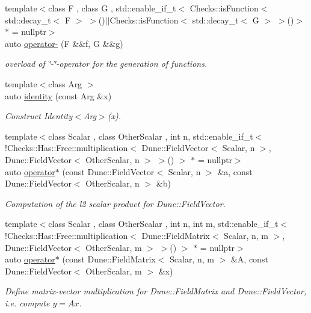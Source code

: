 \begin{DoxyCompactItemize}
{\footnotesize template$<$class F , class G , std\+::enable\+\_\+if\+\_\+t$<$ Checks\+::is\+Function$<$ std\+::decay\+\_\+t$<$ F $>$ $>$()$\vert$$\vert$\+Checks\+::is\+Function$<$ std\+::decay\+\_\+t$<$ G $>$ $>$()$>$ $\ast$  = nullptr$>$ }\\auto \hyperlink{namespaceFunG_a3af04c2ef5c1b206feb75fffd298cbbf}{operator-\/} (F \&\&f, G \&\&g)
\begin{DoxyCompactList}\small\item\em overload of \char`\"{}-\/\char`\"{}-\/operator for the generation of functions. \end{DoxyCompactList}\item 
{\footnotesize template$<$class Arg $>$ }\\auto \hyperlink{namespaceFunG_a165e879e76d3a2a8906938f3658445ce}{identity} (const Arg \&x)
\begin{DoxyCompactList}\small\item\em Construct Identity$<$\+Arg$>$(x). \end{DoxyCompactList}\item 
{\footnotesize template$<$class Scalar , class Other\+Scalar , int n, std\+::enable\+\_\+if\+\_\+t$<$ !\+Checks\+::\+Has\+::\+Free\+::multiplication$<$ Dune\+::\+Field\+Vector$<$ Scalar, n $>$, Dune\+::\+Field\+Vector$<$ Other\+Scalar, n $>$ $>$() $>$ $\ast$  = nullptr$>$ }\\auto \hyperlink{namespaceFunG_a5e258023361844926f485229c62a733b}{operator$\ast$} (const Dune\+::\+Field\+Vector$<$ Scalar, n $>$ \&a, const Dune\+::\+Field\+Vector$<$ Other\+Scalar, n $>$ \&b)
\begin{DoxyCompactList}\small\item\em Computation of the l2 scalar product for Dune\+::\+Field\+Vector. \end{DoxyCompactList}\item 
{\footnotesize template$<$class Scalar , class Other\+Scalar , int n, int m, std\+::enable\+\_\+if\+\_\+t$<$ !\+Checks\+::\+Has\+::\+Free\+::multiplication$<$ Dune\+::\+Field\+Matrix$<$ Scalar, n, m $>$, Dune\+::\+Field\+Vector$<$ Other\+Scalar, m $>$ $>$() $>$ $\ast$  = nullptr$>$ }\\auto \hyperlink{namespaceFunG_abadb8da34a5abc3dde0107231ab91c6f}{operator$\ast$} (const Dune\+::\+Field\+Matrix$<$ Scalar, n, m $>$ \&A, const Dune\+::\+Field\+Vector$<$ Other\+Scalar, m $>$ \&x)
\begin{DoxyCompactList}\small\item\em Define matrix-\/vector multiplication for Dune\+::\+Field\+Matrix and Dune\+::\+Field\+Vector, i.\+e. compute $y=Ax$. \end{DoxyCompactList}\item 

\end{DoxyCompactItemize}
